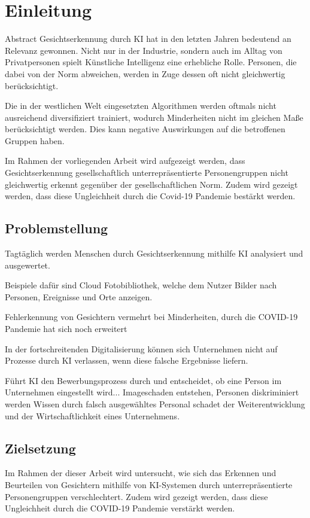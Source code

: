 \section{Einleitung}
Abstract
Gesichtserkennung durch \ac{KI} hat in den letzten Jahren bedeutend an Relevanz gewonnen. Nicht nur in der Industrie, sondern auch im Alltag von Privatpersonen spielt Künstliche Intelligenz eine erhebliche Rolle. Personen, die dabei von der Norm abweichen, werden in Zuge dessen oft nicht gleichwertig berücksichtigt. 

Die in der westlichen Welt eingesetzten Algorithmen werden oftmals nicht ausreichend diversifiziert  trainiert, wodurch Minderheiten nicht im gleichen Maße berücksichtigt werden. Dies kann negative Auswirkungen auf die betroffenen Gruppen haben.

Im Rahmen der vorliegenden Arbeit wird aufgezeigt werden, dass Gesichtserkennung gesellschaftlich unterrepräsentierte Personengruppen nicht gleichwertig erkennt gegenüber der gesellschaftlichen Norm. Zudem wird gezeigt werden, dass diese Ungleichheit durch die Covid-19 Pandemie bestärkt werden.

\subsection{Problemstellung}
Tagtäglich werden Menschen durch Gesichtserkennung mithilfe \ac{KI} analysiert und ausgewertet.

Beispiele dafür sind Cloud Fotobibliothek, welche dem Nutzer Bilder nach Personen, Ereignisse und Orte anzeigen. 

Fehlerkennung von Gesichtern vermehrt bei Minderheiten, 
durch die COVID-19 Pandemie hat sich noch erweitert

In der fortschreitenden Digitalisierung können sich Unternehmen nicht auf Prozesse durch \ac{KI} verlassen, wenn diese falsche Ergebnisse liefern. 

Führt \ac{KI} den Bewerbungsprozess durch und entscheidet, ob eine Person im Unternehmen eingestellt wird...
Imageschaden entstehen, Personen diskriminiert werden 
Wissen durch falsch ausgewähltes Personal schadet der Weiterentwicklung und der Wirtschaftlichkeit eines Unternehmens. 

\subsection{Zielsetzung}
Im Rahmen der dieser Arbeit wird untersucht, wie sich das Erkennen und Beurteilen von Gesichtern mithilfe von KI-Systemen durch unterrepräsentierte Personengruppen verschlechtert. 
Zudem wird gezeigt werden, dass diese Ungleichheit durch die COVID-19 Pandemie verstärkt werden.

